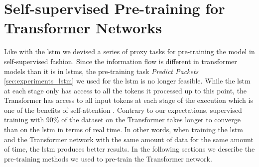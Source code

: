 \section{Self-supervised Pre-training for Transformer Networks} \label{sec:experiments:transformer}

Like with the \gls{lstm} we devised a series of proxy tasks for pre-training the model in self-supervised fashion. Since the information flow is different in transformer models than it is in \glspl{lstm}, the pre-training task \textit{Predict Packets} \ref{sec:experiments_lstm} we used for the \gls{lstm} is no longer feasible. While the \gls{lstm} at each stage only has access to all the tokens it processed up to this point, the Transformer has access to all input tokens at each stage of the execution which is one of the benefits of self-attention \cite{attention}. Contrary to our expectations, supervised training with 90\% of the dataset on the Transformer takes longer to converge than on the \gls{lstm} in terms of real time. In other words, when training the \gls{lstm} and the Transformer network with the same amount of data for the same amount of time, the \gls{lstm} produces better results. In the following sections we describe the pre-training methods we used to pre-train the Transformer network.

